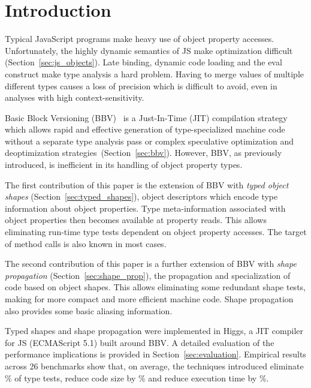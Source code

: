 \documentclass[preprint]{sigplanconf}
\newcommand{\percentstat}[1]{\unskip\%}
\begin{document}
\section{Introduction}\label{sec:intro}






Typical JavaScript programs make heavy use of object property accesses.
Unfortunately, the highly dynamic semantics of JS make optimization difficult
(Section~\ref{sec:js_objects}). Late binding, dynamic code loading and the
eval construct make type analysis a hard problem. Having to merge values of
multiple different types causes a loss of precision which is difficult to
avoid, even in analyses with high context-sensitivity.

Basic Block Versioning (BBV)~\cite{bbv_ecoop} is a Just-In-Time (JIT)
compilation strategy which allows rapid and effective generation of
type-specialized machine code without a separate type analysis pass or
complex speculative optimization and deoptimization
strategies~(Section~\ref{sec:bbv}). However, BBV, as previously
introduced, is inefficient in its handling of object property types.

The first contribution of this paper is the extension of BBV
with {\em typed object shapes} (Section~\ref{sec:typed_shapes}),
object descriptors which encode type information about object properties.
Type meta-information associated with object properties then becomes available
at property reads. This allows eliminating run-time type tests dependent
on object property accesses. The target of method calls is also known in most
cases.

The second contribution of this paper is a further extension of BBV with
{\em shape propagation} (Section~\ref{sec:shape_prop}), the propagation and
specialization of code based on object shapes. This allows eliminating some
redundant shape tests, making for more compact and more efficient machine
code. Shape propagation also provides some basic aliasing information.

Typed shapes and shape propagation were implemented in Higgs, a JIT compiler
for JS (ECMAScript 5.1) built around BBV. A detailed evaluation
of the performance implications
is provided in Section~\ref{sec:evaluation}. Empirical results across 26
benchmarks show that, on average, the techniques introduced eliminate
\percentstat{testcounts_decr_maxshapes2} of type tests, reduce code size by
\percentstat{codesize_decr_maxshapes2} and reduce execution time by
\percentstat{exectime_decr_maxshapes2}.
\end{document}
